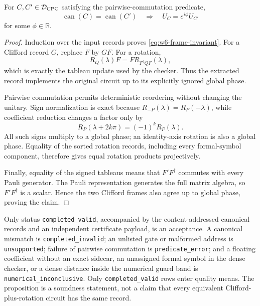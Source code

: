 \begin{proposition}
\label{prop:symbolic-soundness}
For $C,C'\in\mathcal D_{\rm CPC}$ satisfying the pairwise-commutation
predicate,
\begin{equation*}
 \operatorname{can}(C)=\operatorname{can}(C')
 \quad\Longrightarrow\quad
 U_C=e^{i\phi}U_{C'}
\end{equation*}
for some $\phi\in\mathbb R$.
\end{proposition}

\begin{proof}
Induction over the input records proves \eqref{eq:w6-frame-invariant}.
For a Clifford record $G$, replace $F$ by $GF$.  For a rotation,
\begin{equation*}
 R_Q(\lambda)F=F R_{F^\dagger QF}(\lambda),
\end{equation*}
which is exactly the tableau update used by the checker.  Thus the extracted
record implements the original circuit up to its explicitly ignored global
phase.

Pairwise commutation permits deterministic reordering without changing the
unitary.  Sign normalization is exact because
$R_{-P}(\lambda)=R_P(-\lambda)$, while coefficient reduction changes a factor only
by
\begin{equation*}
 R_P(\lambda+2k\pi)=(-1)^kR_P(\lambda).
\end{equation*}
All such signs multiply to a global phase; an
identity-axis rotation is also a global phase.  Equality of the sorted
rotation records, including every formal-symbol component, therefore gives
equal rotation products projectively.

Finally, equality of the signed tableaus means that
$F'F^\dagger$ commutes with every Pauli generator.  The Pauli representation
generates the full matrix algebra, so $F'F^\dagger$ is a scalar.  Hence the
two Clifford frames also agree up to global phase, proving the claim.
\end{proof}

\begin{remark}
\label{rem:w6-certificate-status}
Only status \texttt{completed\_valid}, accompanied by the content-addressed
canonical records and an independent certificate payload, is an acceptance.
A canonical mismatch is \texttt{completed\_invalid}; an unlisted gate or
malformed address is \texttt{unsupported}; failure of pairwise commutation is
\texttt{predicate\_error}; and a floating coefficient without an exact
sidecar, an unassigned formal symbol in the dense checker, or a dense distance
inside the numerical guard band is
\texttt{numerical\_inconclusive}.  Only \texttt{completed\_valid} rows enter
quality means.  The proposition is a soundness statement, not a claim that
every equivalent Clifford-plus-rotation circuit has the same record.
\end{remark}

